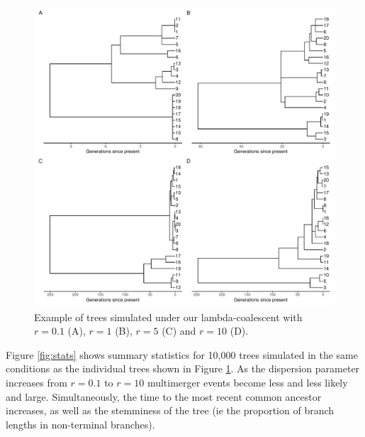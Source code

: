 \documentclass{article}
\begin{document}
\begin{figure}[!t]
\begin{center}
\includegraphics[width=15cm]{../run/figureTree.pdf}
\end{center}
\caption{Example of trees simulated under our lambda-coalescent with $r=0.1$ (A),
$r=1$ (B), $r=5$ (C) and $r=10$ (D).
\label{fig:trees}}
\end{figure}

Figure \ref{fig:stats} shows summary statistics for 10,000 trees simulated in the same conditions
as the individual trees shown in Figure \ref{fig:trees}. 
As the dispersion parameter increases from $r=0.1$
to $r=10$ multimerger events become less and less likely and large. Simultaneously, the
time to the most recent common ancestor increases, as well as the stemminess of the tree 
(ie the proportion of branch lengths in non-terminal branches).
\end{document}
